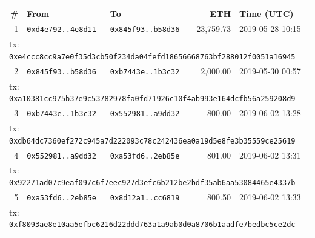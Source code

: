 {\scriptsize\begin{longtable}{r p{2.9cm} p{2.9cm} r p{2.5cm}}\toprule
\textbf{\#} & \textbf{From} & \textbf{To} & \textbf{ETH} & \textbf{Time (UTC)}\\\midrule\endhead
1 & \texttt{0xd4e792..4e8d11} & \texttt{0x845f93..b58d36} & 23,759.73 & 2019-05-28 10:15\\
\multicolumn{5}{l}{\quad tx: \texttt{0xe4ccc8cc9a7e0f35d3cb50f234da04fefd18656668763bf288012f0051a16945}}\\
2 & \texttt{0x845f93..b58d36} & \texttt{0xb7443e..1b3c32} & 2,000.00 & 2019-05-30 00:57\\
\multicolumn{5}{l}{\quad tx: \texttt{0xa10381cc975b37e9c53782978fa0fd71926c10f4ab993e164dcfb56a259208d9}}\\
3 & \texttt{0xb7443e..1b3c32} & \texttt{0x552981..a9dd32} & 800.00 & 2019-06-02 13:28\\
\multicolumn{5}{l}{\quad tx: \texttt{0xdb64dc7360ef272c945a7d222093c78c242436ea0a19d5e8fe3b35559ce25619}}\\
4 & \texttt{0x552981..a9dd32} & \texttt{0xa53fd6..2eb85e} & 801.00 & 2019-06-02 13:31\\
\multicolumn{5}{l}{\quad tx: \texttt{0x92271ad07c9eaf097c6f7eec927d3efc6b212be2bdf35ab6aa53084465e4337b}}\\
5 & \texttt{0xa53fd6..2eb85e} & \texttt{0x8d12a1..cc6819} & 800.50 & 2019-06-02 13:33\\
\multicolumn{5}{l}{\quad tx: \texttt{0xf8093ae8e10aa5efbc6216d22ddd763a1a9ab0d0a8706b1aadfe7bedbc5ce2dc}}\\
\bottomrule\end{longtable}}
